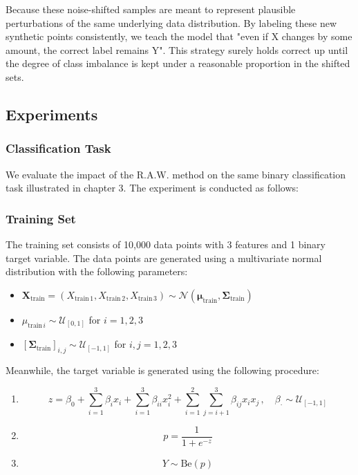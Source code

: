 \begin{tcolorbox}[colback=gray!5,colframe=gray!40,title= Why Keep the Same Label?]
    Because these noise-shifted samples are meant to represent plausible perturbations of the same underlying data distribution. By labeling these new synthetic points consistently, we teach the model that "even if X changes by some amount, the correct label remains Y". This strategy surely holds correct up until the degree of class imbalance is kept under a reasonable proportion in the shifted sets.
\end{tcolorbox}





\subsection{Experiments}
\subsubsection{\textbf{Classification Task}}

We evaluate the impact of the R.A.W. method on the same binary classification task illustrated in chapter 3. The experiment is conducted as follows:
\subsubsection{Training Set}
The training set consists of 10,000 data points with 3 features and 1 binary target variable. The data points are generated using a multivariate normal distribution with the following parameters:

\begin{itemize}
    \item $ \boldsymbol{X}_{\text{train}} = (X_{\text{train}\,1}, X_{\text{train}\,2}, X_{\text{train}\,3}) \sim \mathcal{N}(\boldsymbol{\mu}_{\text{train}}, \boldsymbol{\Sigma}_{\text{train}}) $
    \item $ \mu_{\text{train}\,i} \sim \mathcal{U}_{[0,1]} $ for $ i = 1, 2, 3 $
    \item $ [\boldsymbol{\Sigma}_{\text{train}}]_{i,j} \sim \mathcal{U}_{[-1,1]} $ for $ i, j = 1, 2, 3 $
\end{itemize}

Meanwhile, the target variable is generated using the following procedure:

\begin{enumerate}
    \item $$ 
    z = \beta_0 + \sum_{i=1}^3 \beta_i x_i + \sum_{i=1}^3 \beta_{ii} x_i^2 + \sum_{i=1}^{2} \sum_{j=i+1}^3 \beta_{ij} x_i x_j\,,   \quad \beta_{\cdot} \sim \mathcal{U}_{[-1,1]}
    $$
    \item $$ p = \frac{1}{1 + e^{-z}}$$
    \item $$ Y \sim \text{Be}(p)$$
\end{enumerate}

